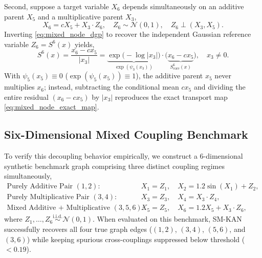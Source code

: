 \documentclass[11pt,a4paper]{article}
\theoremstyle{plain}
\theoremstyle{definition}
\theoremstyle{remark}
\begin{document}
Second, suppose a target variable $X_6$ depends simultaneously on an additive parent $X_5$ and a multiplicative parent $X_3$,
\begin{equation}
    X_6 = c X_5 + X_3 \cdot Z_6, \quad Z_6 \sim \mathcal{N}(0, 1), \quad Z_6 \perp (X_3, X_5).
    \label{eq:mixed_node_dgp}
\end{equation}
Inverting \eqref{eq:mixed_node_dgp} to recover the independent Gaussian reference variable $Z_6 = S^6(x)$ yields,
\begin{equation}
    S^6(x) = \frac{x_6 - c x_5}{|x_3|} = \underbrace{\exp\big(-\log|x_3|\big)}_{\exp(\psi_3(x_3))} \cdot \big(\underbrace{x_6 - c x_5}_{S^6_{\text{core}}(x)}\big), \quad x_3 \neq 0.
    \label{eq:mixed_node_exact_map}
\end{equation}
With $\psi_5(x_5) \equiv 0$ ($\exp(\psi_5(x_5)) \equiv 1$), the additive parent $x_5$ never multiplies $x_6$; instead, subtracting the conditional mean $c x_5$ and dividing the entire residual $(x_6 - c x_5)$ by $|x_3|$ reproduces the exact transport map \eqref{eq:mixed_node_exact_map}.

\subsection{Six-Dimensional Mixed Coupling Benchmark}
\label{subsec:mixed_coupling_graph}

To verify this decoupling behavior empirically, we construct a 6-dimensional synthetic benchmark graph comprising three distinct coupling regimes simultaneously,
\begin{align}
    \text{Purely Additive Pair }(1, 2): &\quad X_1 = Z_1, \quad X_2 = 1.2\sin(X_1) + Z_2, \\
    \text{Purely Multiplicative Pair }(3, 4): &\quad X_3 = Z_3, \quad X_4 = X_3 \cdot Z_4, \\
    \text{Mixed Additive + Multiplicative }(3, 5, 6): &\quad X_5 = Z_5, \quad X_6 = 1.2 X_5 + X_3 \cdot Z_6,
\end{align}
where $Z_1, \dots, Z_6 \stackrel{\text{i.i.d.}}{\sim} \mathcal{N}(0, 1)$. When evaluated on this benchmark, SM-KAN successfully recovers all four true graph edges ($(1, 2)$, $(3, 4)$, $(5, 6)$, and $(3, 6)$) while keeping spurious cross-couplings suppressed below threshold ($< 0.19$).
\end{document}
